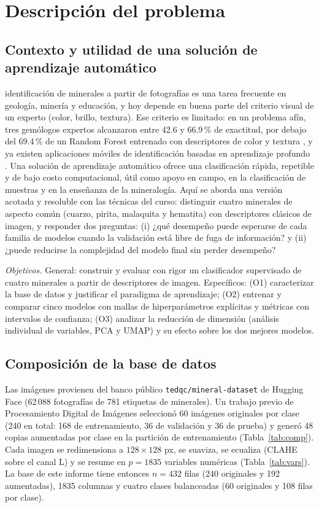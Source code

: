 \documentclass[journal]{IEEEtran}
\begin{document}
\section{Descripción del problema}
\subsection{Contexto y utilidad de una solución de aprendizaje automático}
 identificación de minerales a partir de fotografías es una tarea frecuente en geología, minería y educación, y hoy depende en buena parte del criterio visual de un experto (color, brillo, textura). Ese criterio es limitado: en un problema afín, tres gemólogos expertos alcanzaron entre 42.6 y 66.9\,\% de exactitud, por debajo del 69.4\,\% de un Random Forest entrenado con descriptores de color y textura \cite{chow2022}, y ya existen aplicaciones móviles de identificación basadas en aprendizaje profundo \cite{zeng2021}. Una solución de aprendizaje automático ofrece una clasificación rápida, repetible y de bajo costo computacional, útil como apoyo en campo, en la clasificación de muestras y en la enseñanza de la mineralogía. Aquí se aborda una versión acotada y resoluble con las técnicas del curso: distinguir cuatro minerales de aspecto común (cuarzo, pirita, malaquita y hematita) con descriptores clásicos de imagen, y responder dos preguntas: (i) ¿qué desempeño puede esperarse de cada familia de modelos cuando la validación está libre de fuga de información? y (ii) ¿puede reducirse la complejidad del modelo final sin perder desempeño?

\emph{Objetivos.} General: construir y evaluar con rigor un clasificador supervisado de cuatro minerales a partir de descriptores de imagen. Específicos: (O1) caracterizar la base de datos y justificar el paradigma de aprendizaje; (O2) entrenar y comparar cinco modelos con mallas de hiperparámetros explícitas y métricas con intervalos de confianza; (O3) analizar la reducción de dimensión (análisis individual de variables, PCA y UMAP) y su efecto sobre los dos mejores modelos.

\subsection{Composición de la base de datos}
Las imágenes provienen del banco público \texttt{tedqc/\allowbreak mineral-dataset} de Hugging Face \cite{hfdata} (62\,088 fotografías de 781 etiquetas de minerales). Un trabajo previo de Procesamiento Digital de Imágenes \cite{repo} seleccionó 60 imágenes originales por clase (240 en total: 168 de entrenamiento, 36 de validación y 36 de prueba) y generó 48 copias aumentadas por clase en la partición de entrenamiento (Tabla~\ref{tab:comp}). Cada imagen se redimensiona a $128\times128$ px, se suaviza, se ecualiza (CLAHE sobre el canal L) y se resume en $p=1835$ variables numéricas (Tabla~\ref{tab:vars}). La base de este informe tiene entonces $n=432$ filas (240 originales y 192 aumentadas), 1835 columnas y cuatro clases balanceadas (60 originales y 108 filas por clase).
\end{document}
